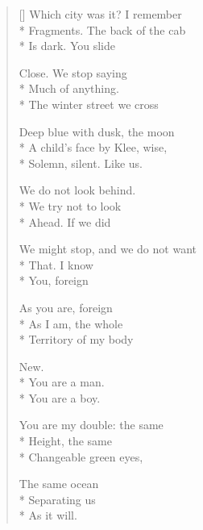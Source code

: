 \label{ch:northampton}
\settowidth{\versewidth}{We might stop, and we do not want}
\begin{verse}[\versewidth]
Which city was it? I remember\\*
Fragments. The back of the cab\\*
Is dark. You slide

Close. We stop saying\\*
Much of anything.\\*
The winter street we cross

Deep blue with dusk, the moon\\*
A child's face by Klee, wise,\\*
Solemn, silent. Like us.

We do not look behind.\\*
We try not to look\\*
Ahead. If we did

We might stop, and we do not want\\*
That. I know\\*
You, foreign

As you are, foreign\\*
As I am, the whole\\*
Territory of my body

New.\\*
You are a man.\\*
You are a boy.

You are my double: the same\\*
Height, the same\\*
Changeable green eyes,

The same ocean\\*
Separating us\\*
As it will.
\end{verse}
